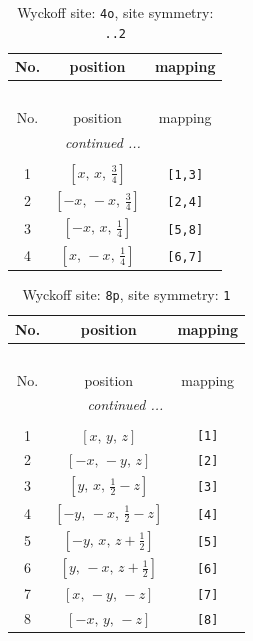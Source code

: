 \documentclass[fleqn,8pt]{jsarticle}
\begin{document}
\renewcommand{\arraystretch}{1.2}
\begin{longtable}{ccc}
\caption{Wyckoff site: {\tt 4o}, site symmetry: {\tt ..2}}
 \\
 \hline \hline
No. & position & mapping \\ \hline \endfirsthead

\multicolumn{2}{l}{\tablename\ \thetable{}} \\
 \hline \hline
No. & position & mapping \\ \hline \endhead

 \hline \hline
\multicolumn{2}{r}{\footnotesize\it continued ...} \\ \endfoot

 \hline \hline
\multicolumn{2}{r}{} \\ \endlastfoot

1 & $\left[ x,\, x,\, \frac{3}{4} \right]$ & {\tt [1,3]} \\ \hline
2 & $\left[ - x,\, - x,\, \frac{3}{4} \right]$ & {\tt [2,4]} \\ \hline
3 & $\left[ - x,\, x,\, \frac{1}{4} \right]$ & {\tt [5,8]} \\ \hline
4 & $\left[ x,\, - x,\, \frac{1}{4} \right]$ & {\tt [6,7]} \\
\end{longtable}
\renewcommand{\arraystretch}{1.2}
\begin{longtable}{ccc}
\caption{Wyckoff site: {\tt 8p}, site symmetry: {\tt 1}}
 \\
 \hline \hline
No. & position & mapping \\ \hline \endfirsthead

\multicolumn{2}{l}{\tablename\ \thetable{}} \\
 \hline \hline
No. & position & mapping \\ \hline \endhead

 \hline \hline
\multicolumn{2}{r}{\footnotesize\it continued ...} \\ \endfoot

 \hline \hline
\multicolumn{2}{r}{} \\ \endlastfoot

1 & $\left[ x,\, y,\, z \right]$ & {\tt [1]} \\ \hline
2 & $\left[ - x,\, - y,\, z \right]$ & {\tt [2]} \\ \hline
3 & $\left[ y,\, x,\, \frac{1}{2} - z \right]$ & {\tt [3]} \\ \hline
4 & $\left[ - y,\, - x,\, \frac{1}{2} - z \right]$ & {\tt [4]} \\ \hline
5 & $\left[ - y,\, x,\, z + \frac{1}{2} \right]$ & {\tt [5]} \\ \hline
6 & $\left[ y,\, - x,\, z + \frac{1}{2} \right]$ & {\tt [6]} \\ \hline
7 & $\left[ x,\, - y,\, - z \right]$ & {\tt [7]} \\ \hline
8 & $\left[ - x,\, y,\, - z \right]$ & {\tt [8]} \\
\end{longtable}
\end{document}
